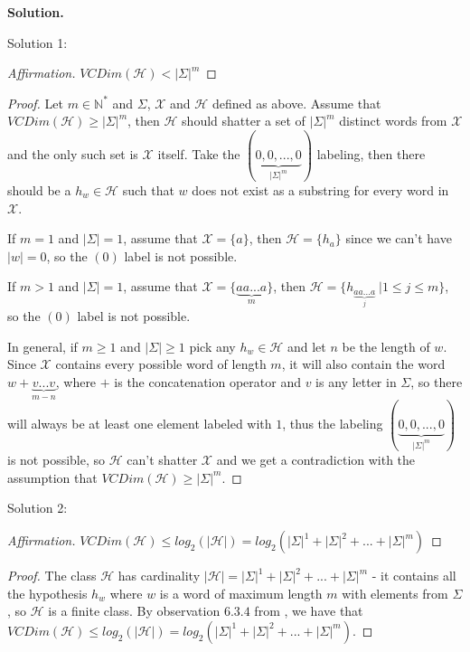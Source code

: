\documentclass{article}
\newcommand{\<}{\langle}
\renewcommand{\>}{\rangle}
\theoremstyle{definition}
\begin{document}
\textbf{Solution.}

Solution 1:
\begin{proof}[Affirmation]\renewcommand{\qedsymbol}{}
$VCDim(\mathcal{H}) < |\Sigma|^m$
\end{proof}

\begin{proof}

Let $m\in\mathbb{N}^*$ and $\Sigma$, $\mathcal{X}$ and $\mathcal{H}$ defined as above. Assume that $VCDim(\mathcal{H})\geq|\Sigma|^m$, then $\mathcal{H}$ should shatter a set of $|\Sigma|^m$ distinct words from $\mathcal{X}$ and the only such set is $\mathcal{X}$ itself. Take the $(\underbrace{0, 0, ..., 0}_{|\Sigma|^m})$ labeling, then there should be a $h_w\in\mathcal{H}$ such that $w$ does not exist as a substring for every word in $\mathcal{X}$. 

If $m=1$ and $|\Sigma|=1$, assume that $\mathcal{X}=\{a\}$, then $\mathcal{H}=\{h_a\}$ since we can't have $|w|=0$, so the $(0)$ label is not possible.

If $m>1$ and $|\Sigma|=1$, assume that $\mathcal{X}=\{\underbrace{aa...a}_m\}$, then $\mathcal{H}=\{h_{\underbrace{aa...a}_{j}}\ | 1 \leq j \leq m\}$, so the $(0)$ label is not possible.

In general, if $m\geq1$ and $|\Sigma|\geq1$ pick any $h_w \in \mathcal{H}$ and let $n$ be the length of $w$. Since $\mathcal{X}$ contains every possible word of length $m$, it will also contain the word $w+\underbrace{v...v}_{m-n}$, where $+$ is the concatenation operator and $v$ is any letter in $\Sigma$, so there will always be at least one element labeled with $1$, thus the labeling $(\underbrace{0, 0, ..., 0}_{|\Sigma|^m})$ is not possible, so $\mathcal{H}$ can't shatter $\mathcal{X}$ and we get a contradiction with the assumption that $VCDim(\mathcal{H})\geq |\Sigma|^m$.
\end{proof}

Solution 2:
\begin{proof}[Affirmation]\renewcommand{\qedsymbol}{}
$VCDim(\mathcal{H}) \leq log_2(|\mathcal{H}|) = log_2(|\Sigma|^1+|\Sigma|^2+...+|\Sigma|^m)$
\end{proof}

\begin{proof}
The class $\mathcal{H}$ has cardinality $|\mathcal{H}| = |\Sigma|^1+|\Sigma|^2+...+|\Sigma|^m$ - it contains all the hypothesis $h_w$ where $w$ is a word of maximum length $m$ with elements from $\Sigma$, so $\mathcal{H}$ is a finite class. By observation $6.3.4$ from \cite{SS}, we have that $VCDim(\mathcal{H}) \leq log_2(|\mathcal{H}|) = log_2(|\Sigma|^1+|\Sigma|^2+...+|\Sigma|^m)$.
\end{proof}
\end{document}
